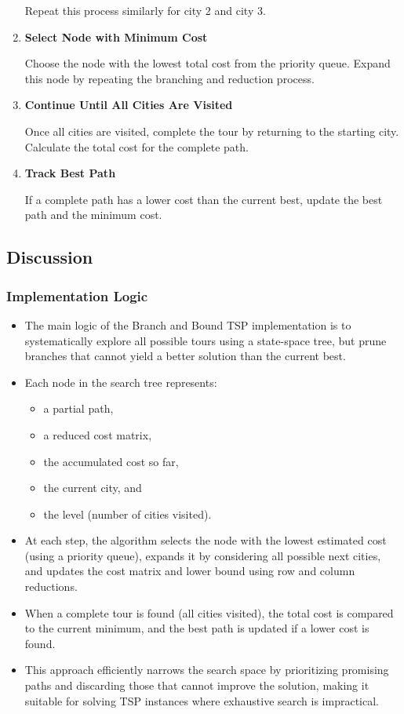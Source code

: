 \documentclass{article}
\begin{document}
\begin{enumerate}
    Repeat this process similarly for city 2 and city 3.

    \item \textbf{Select Node with Minimum Cost}

    Choose the node with the lowest total cost from the priority queue. Expand this node by repeating the branching and reduction process.

    \item \textbf{Continue Until All Cities Are Visited}

    Once all cities are visited, complete the tour by returning to the starting city. Calculate the total cost for the complete path.

    \item \textbf{Track Best Path}

    If a complete path has a lower cost than the current best, update the best path and the minimum cost.
\end{enumerate}



\subsection*{Discussion}
\subsubsection*{Implementation Logic}
\begin{itemize}
    \item The main logic of the Branch and Bound TSP implementation is to systematically explore all possible tours using a state-space tree, but prune branches that cannot yield a better solution than the current best.
    \item Each node in the search tree represents:
    \begin{itemize}
        \item a partial path,
        \item a reduced cost matrix,
        \item the accumulated cost so far,
        \item the current city, and
        \item the level (number of cities visited).
    \end{itemize}
    \item At each step, the algorithm selects the node with the lowest estimated cost (using a priority queue), expands it by considering all possible next cities, and updates the cost matrix and lower bound using row and column reductions.
    \item When a complete tour is found (all cities visited), the total cost is compared to the current minimum, and the best path is updated if a lower cost is found.
    \item This approach efficiently narrows the search space by prioritizing promising paths and discarding those that cannot improve the solution, making it suitable for solving TSP instances where exhaustive search is impractical.
\end{itemize}
\end{document}
